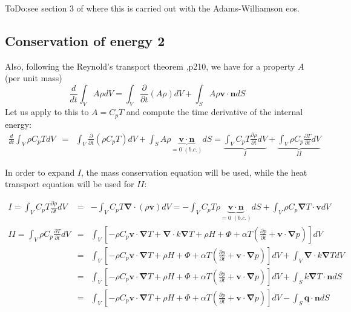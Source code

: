 {\color{red} ToDo}:see section 3 of \cite{lezh08} where this is carried out with the Adams-Williamson eos.


\subsection*{Conservation of energy 2}
Also, following the Reynold's transport theorem \cite{malvern},p210, we have for a property $A$ (per unit mass)
\[
\frac{d}{dt} \int_V A \rho dV = \int_V \frac{\partial }{\partial t} (A\rho) dV + \int_S A \rho {\bm v}\cdot {\bm n} dS
\]
Let us apply to this to $A=C_p T$ and compute the time derivative of the internal energy:
\begin{eqnarray}
\frac{d}{dt} \int_V \rho C_p T dV 
&=& \int_V \frac{\partial }{\partial t} (\rho C_p T ) dV + \int_S A \rho \underbrace{{\bm v}\cdot {\bm n}}_{=0 \; (b.c.)} dS 
= \underbrace{\int_V C_p T \frac{\partial \rho}{\partial t} dV}_{I} 
+ \underbrace{\int_V \rho C_p \frac{\partial T}{\partial t}  dV }_{II}
\end{eqnarray}

In order to expand $I$, the mass conservation equation will be used, while the heat transport equation 
will be used for $II$:

\begin{eqnarray}
I= \int_V C_p T \frac{\partial \rho}{\partial t} dV
&=& 
- \int_V C_p T {\bm \nabla} \cdot (\rho {\bm v}) dV
=
-\int_V C_p T \rho \underbrace{{\bm v} \cdot {\bm n}}_{=0 \; (b.c.)} dS +  \int_V \rho C_p  {\bm \nabla}  T \cdot {\bm v} dV
\\
II=\int_V \rho C_p \frac{\partial T}{\partial t}  dV
&=&  
 \int_V \left[ -\rho C_p {\bm v}\cdot {\bm \nabla}T +{\bm \nabla}\cdot k {\bm \nabla} T + \rho H  + \Phi    +\alpha T \left( \frac{\partial p}{\partial t}+  \bm v \cdot {\bm \nabla} p \right) \right]  dV \\ 
&=& 
 \int_V \left[ -\rho C_p {\bm v}\cdot {\bm \nabla}T 
+ \rho H  + \Phi    +\alpha T \left( \frac{\partial p}{\partial t}+  \bm v \cdot {\bm \nabla} p \right) \right]  dV 
+ \int_V {\bm \nabla}\cdot k {\bm \nabla} T dV \\ 
&=& 
 \int_V \left[ -\rho C_p {\bm v}\cdot {\bm \nabla}T 
+ \rho H  + \Phi    +\alpha T \left( \frac{\partial p}{\partial t}+  \bm v \cdot {\bm \nabla} p \right) \right]  dV 
+ \int_S  k {\bm \nabla} T \cdot {\bm n}  dS \\ 
&=& 
 \int_V \left[ -\rho C_p {\bm v}\cdot {\bm \nabla}T 
+ \rho H  + \Phi    +\alpha T \left( \frac{\partial p}{\partial t}+  \bm v \cdot {\bm \nabla} p \right) \right]  dV 
- \int_S  {\bm q} \cdot {\bm n}  dS \label{ba004}
\end{eqnarray}

